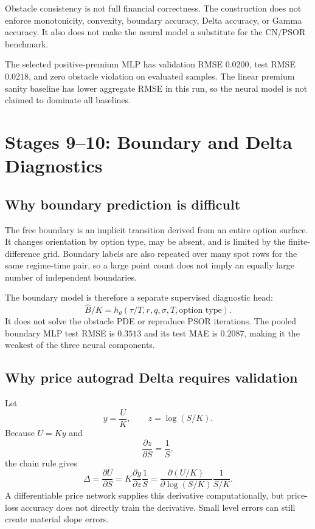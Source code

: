 \begin{commonconfusion}
Obstacle consistency is not full financial correctness. The construction does
not enforce monotonicity, convexity, boundary accuracy, Delta accuracy, or
Gamma accuracy. It also does not make the neural model a substitute for the
CN/PSOR benchmark.
\end{commonconfusion}

The selected positive-premium MLP has validation RMSE \(0.0200\), test RMSE
\(0.0218\), and zero obstacle violation on evaluated samples. The linear
premium sanity baseline has lower aggregate RMSE in this run, so the neural
model is not claimed to dominate all baselines.

\section{Stages 9--10: Boundary and Delta Diagnostics}

\subsection{Why boundary prediction is difficult}
The free boundary is an implicit transition derived from an entire option
surface. It changes orientation by option type, may be absent, and is limited
by the finite-difference grid. Boundary labels are also repeated over many
spot rows for the same regime-time pair, so a large point count does not imply
an equally large number of independent boundaries.

The boundary model is therefore a separate supervised diagnostic head:
\[
  \widehat B/K=h_\theta(\tau/T,r,q,\sigma,T,\text{option type}).
\]
It does not solve the obstacle PDE or reproduce PSOR iterations. The pooled
boundary MLP test RMSE is \(0.3513\) and its test MAE is \(0.2087\), making it
the weakest of the three neural components.

\subsection{Why price autograd Delta requires validation}
Let
\[
  y=\frac{U}{K},
  \qquad
  z=\log(S/K).
\]
Because \(U=Ky\) and
\[
  \frac{\partial z}{\partial S}=\frac{1}{S},
\]
the chain rule gives
\[
  \Delta
  =
  \frac{\partial U}{\partial S}
  =
  K\frac{\partial y}{\partial z}\frac{1}{S}
  =
  \frac{\partial (U/K)}{\partial \log(S/K)}
  \frac{1}{S/K}.
\]
A differentiable price network supplies this derivative computationally, but
price-loss accuracy does not directly train the derivative. Small level errors
can still create material slope errors.

